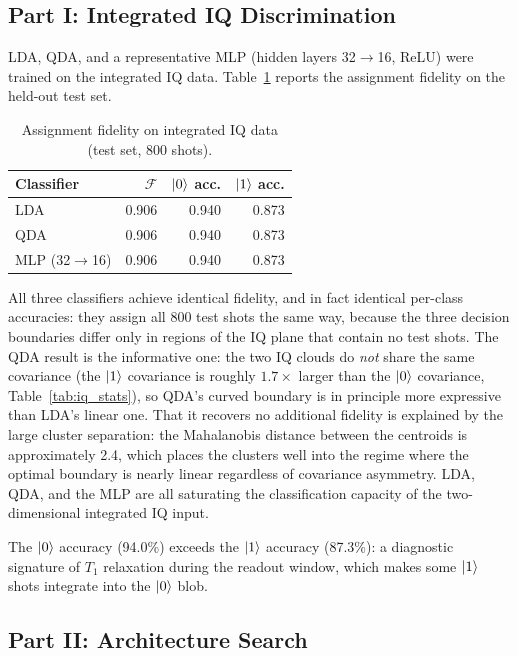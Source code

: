 \subsection{Part I: Integrated IQ Discrimination}
\label{subsec:integrated_iq}

LDA, QDA, and a representative MLP (hidden layers 32$\to$16, ReLU) were trained
on the integrated IQ data.  Table~\ref{tab:integrated_results} reports the
assignment fidelity on the held-out test set.

\begin{table}[ht]
\centering
\caption{Assignment fidelity on integrated IQ data (test set, 800 shots).}
\label{tab:integrated_results}
\begin{tabular}{lrrr}
\toprule
Classifier & $\mathcal{F}$ & $\ket{0}$ acc. & $\ket{1}$ acc. \\
\midrule
LDA             & 0.906 & 0.940 & 0.873 \\
QDA             & 0.906 & 0.940 & 0.873 \\
MLP (32$\to$16) & 0.906 & 0.940 & 0.873 \\
\bottomrule
\end{tabular}
\end{table}

All three classifiers achieve identical fidelity, and in fact identical per-class
accuracies: they assign all 800 test shots the same way, because the three decision
boundaries differ
only in regions of the IQ plane that contain no test shots.  The QDA result is the
informative one: the two IQ clouds do \emph{not} share
the same covariance (the
$\ket{1}$ covariance is roughly $1.7\times$ larger than the $\ket{0}$ covariance,
Table~\ref{tab:iq_stats}), so QDA's curved boundary is in principle more expressive
than LDA's linear one.  That it recovers no additional fidelity is explained by the
large cluster separation: the Mahalanobis distance between the centroids is
approximately 2.4, which places the clusters well into the regime where the optimal
boundary is nearly linear regardless of covariance asymmetry.  LDA, QDA, and the MLP
are all saturating the classification capacity of the two-dimensional integrated IQ
input.

The $\ket{0}$ accuracy (94.0\%) exceeds the $\ket{1}$ accuracy (87.3\%): a
diagnostic signature of $T_1$ relaxation during the readout window, which makes
some $\ket{1}$ shots integrate into the $\ket{0}$ blob.

\subsection{Part II: Architecture Search}
\label{subsec:arch_search}


